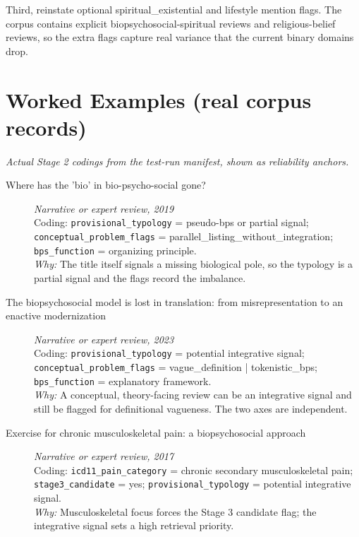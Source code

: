 \documentclass[11pt]{article}
\begin{document}
Third, reinstate optional spiritual\_existential and lifestyle mention flags. The corpus contains explicit biopsychosocial-spiritual reviews and religious-belief reviews, so the extra flags capture real variance that the current binary domains drop.


\section*{Worked Examples (real corpus records)}
{\small\itshape Actual Stage 2 codings from the test-run manifest, shown as reliability anchors.}\par\smallskip
\begin{description}
\item[Where has the 'bio' in bio-psycho-social gone?] {\small \textit{Narrative or expert review, 2019}}\\
{\small Coding: \texttt{provisional\_typology} = pseudo-bps or partial signal; \texttt{conceptual\_problem\_flags} = parallel\_listing\_without\_integration; \texttt{bps\_function} = organizing principle.\\ \textit{Why:} The title itself signals a missing biological pole, so the typology is a partial signal and the flags record the imbalance.}
\item[The biopsychosocial model is lost in translation: from misrepresentation to an enactive modernization] {\small \textit{Narrative or expert review, 2023}}\\
{\small Coding: \texttt{provisional\_typology} = potential integrative signal; \texttt{conceptual\_problem\_flags} = vague\_definition | tokenistic\_bps; \texttt{bps\_function} = explanatory framework.\\ \textit{Why:} A conceptual, theory-facing review can be an integrative signal and still be flagged for definitional vagueness. The two axes are independent.}
\item[Exercise for chronic musculoskeletal pain: a biopsychosocial approach] {\small \textit{Narrative or expert review, 2017}}\\
{\small Coding: \texttt{icd11\_pain\_category} = chronic secondary musculoskeletal pain; \texttt{stage3\_candidate} = yes; \texttt{provisional\_typology} = potential integrative signal.\\ \textit{Why:} Musculoskeletal focus forces the Stage 3 candidate flag; the integrative signal sets a high retrieval priority.}
\end{description}
\end{document}
